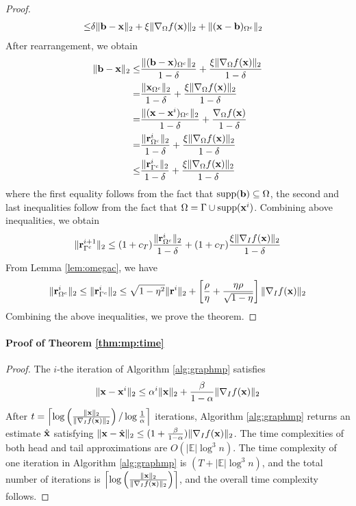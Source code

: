 \documentclass{article}
\begin{document}
\begin{proof}
\begin{align*}
\leq&\delta\|{\bf b}-{\bf x}\|_2+\xi\|\nabla_{\Omega}f({\bf x})\|_2+\|({\bf x}-{\bf b})_{\Omega^c}\|_2
\end{align*}
After rearrangement, we obtain
\begin{align*}
\|{\bf b}-{\bf x}\|_2\leq&\frac{\|({\bf b}-{\bf x})_{\Omega^c}\|_2}{1-\delta}+\frac{\xi\|\nabla_{\Omega} f({\bf x})\|_2}{1-\delta}\\
=&\frac{\|{\bf x}_{\Omega^c}\|_2}{1-\delta}+\frac{\xi\|\nabla_{\Omega} f({\bf x})\|_2}{1-\delta}\\
=&\frac{\|({\bf x}-{\bf x}^i)_{\Omega^c}\|_2}{1-\delta}+\frac{\nabla_{\Omega}f({\bf x})}{1-\delta}\\
=&\frac{\|{\bf r}_{\Omega^c}^i\|_2}{1-\delta}+\frac{\xi\|\nabla_{\Omega} f({\bf x})\|_2}{1-\delta}\\
\leq&\frac{\|{\bf r}_{\Gamma^c}^i\|_2}{1-\delta}+\frac{\xi\|\nabla_{\Omega}f({\bf x})\|_2}{1-\delta}
\end{align*}
where the first equality follows from the fact that $\mathrm{supp}({\bf b})\subseteq\Omega$, the second and last inequalities follow from the fact that $\Omega=\Gamma\cup\mathrm{supp}({\bf x}^i)$. Combining above inequalities, we obtain
\[
\|{\bf r}_{\Gamma^c}^{i+1}\|_2\leq(1+c_T)\frac{\|{\bf r}_{\Omega^c}^i\|_2}{1-\delta}+(1+c_T)\frac{\xi\|\nabla_I f({\bf x})\|_2}{1-\delta}
\]
From Lemma \ref{lem:omegac}, we have
\[
\|{\bf r}_{\Omega^c}^i\|_2\leq\|{\bf r}_{\Gamma^c}^i\|_2\leq\sqrt{1-\eta^2}\|{\bf r}^i\|_2+\left[\frac{\rho}{\eta}+\frac{\eta\rho}{\sqrt{1-\eta}} \right]\|\nabla_I f({\bf x})\|_2
\]
Combining the above inequalities, we prove the theorem.
\end{proof}

\paragraph{Proof of Theorem \ref{thm:mp:time}}
\begin{proof}
The $i$-the iteration of Algorithm \ref{alg:graphmp} satisfies
\begin{equation}
\|{\bf x}-{\bf x}^i\|_2\leq\alpha^i\|{\bf x}\|_2+\frac{\beta}{1-\alpha}\|\nabla_I f({\bf x})\|_2
\end{equation}
After $t=\left\lceil\log\left(\frac{\|{\bf x}\|_2}{\|\nabla_I f({\bf x})\|_2} \right)/\log\frac{1}{\alpha} \right\rceil$ iterations, Algorithm \ref{alg:graphmp} returns an estimate $\hat{\bf x}$ satisfying $\|{\bf x}-\hat{\bf x}\|_2\leq(1+\frac{\beta}{1-\alpha})\|\nabla_I f({\bf x})\|_2$. The time complexities of both head and tail approximations are $O(|\mathbb{E}|\log^3 n)$. The time complexity of one iteration in Algorithm \ref{alg:graphmp} is $(T+|\mathbb{E}|\log^3 n)$, and the total number of iterations is $\left\lceil \log\left(\frac{\|{\bf x}\|_2}{\|\nabla_I f({\bf x})\|_2} \right)\right\rceil$, and the overall time complexity follows.
\end{proof}
\end{document}
